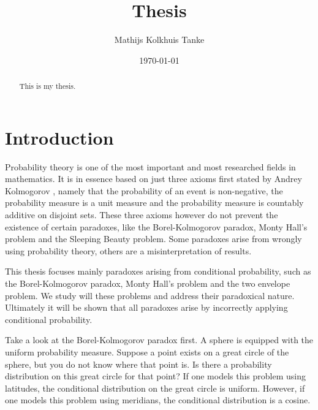 \documentclass[a4paper]{report}
\title{Thesis}
\author{Mathijs Kolkhuis Tanke}
\date{\today}
\theoremstyle{plain}
\theoremstyle{definition}
\theoremstyle{remark}
\numberwithin{equation}{chapter}
\DeclareMathOperator{\1}{\mathbbm{1}}
\begin{document}
\begin{titlepage}

\maketitle
\end{titlepage}


\begin{abstract}
This is my thesis.
\end{abstract}


\tableofcontents

\chapter{Introduction}
Probability theory is one of the most important and most researched fields in mathematics. It is in essence based on just three axioms first stated by Andrey Kolmogorov \cite{Kolmogorov33}, namely that the probability of an event is non-negative, the probability measure is a unit measure and the probability measure is countably additive on disjoint sets. These three axioms however do not prevent the existence of certain paradoxes, like the Borel-Kolmogorov paradox, Monty Hall's problem and the Sleeping Beauty problem. Some paradoxes arise from wrongly using probability theory, others are a misinterpretation of results.

This thesis focuses mainly paradoxes arising from conditional probability, such as the Borel-Kolmogorov paradox, Monty Hall's problem and the two envelope problem. We study will these problems and address their paradoxical nature. Ultimately it will be shown that all paradoxes arise by incorrectly applying conditional probability.

Take a look at the Borel-Kolmogorov paradox first. A sphere is equipped with the uniform probability measure. Suppose a point exists on a great circle of the sphere, but you do not know where that point is. Is there a probability distribution on this great circle for that point? If one models this problem using latitudes, the conditional distribution on the great circle is uniform. However, if one models this problem using meridians, the conditional distribution is a cosine.
\end{document}
